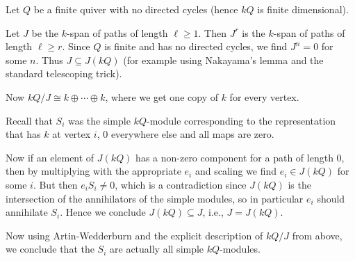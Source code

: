 Let $Q$ be a finite quiver with no directed cycles (hence $kQ$ is finite dimensional).

Let $J$ be the $k$-span of paths of length $\ell\geq 1$. Then
$J^r$ is the $k$-span of paths of length $\ell\geq r$. Since $Q$ is finite and has
no directed cycles, we find $J^n = 0$ for some $n$. Thus $J \subseteq J(kQ)$
(for example using Nakayama's lemma and the standard telescoping trick).

Now $kQ/J\cong k\oplus\cdots\oplus k$, where we get one copy of $k$ for every
vertex.

Recall that $S_i$ was the simple $kQ$-module corresponding to the
representation that has $k$ at vertex $i$, $0$ everywhere else and all maps
are zero.

Now if an element of $J(kQ)$ has a non-zero component for a path of length $0$,
then by multiplying with the appropriate $e_i$ and scaling we find $e_i \in J(kQ)$
for some $i$. But then $e_iS_i \neq 0$, which is a contradiction since
$J(kQ)$ is the intersection of the annihilators of the simple modules, so in particular
$e_i$ should annihilate $S_i$. Hence we conclude $J(kQ) \subseteq J$, i.e.,
$J = J(kQ)$.

Now using Artin-Wedderburn and the explicit description of $kQ/J$ from above,
we conclude that the $S_i$ are actually all simple $kQ$-modules.

